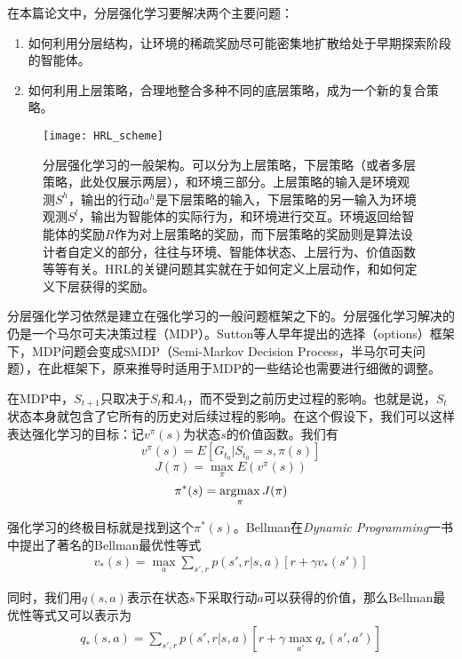 在本篇论文中，分层强化学习要解决两个主要问题：
\begin{enumerate}
  \item 如何利用分层结构，让环境的稀疏奖励尽可能密集地扩散给处于早期探索阶段的智能体。
  \item 如何利用上层策略，合理地整合多种不同的底层策略，成为一个新的复合策略。
\end{enumerate}

\begin{figure}[h] %
  \centering
  \texttt{[image: HRL\_scheme]}
  \caption{分层强化学习的一般架构。可以分为上层策略，下层策略（或者多层策略，此处仅展示两层），和环境三部分。上层策略的输入是环境观测$S^h$，输出的行动$a^h$是下层策略的输入，下层策略的另一输入为环境观测$S^l$，输出为智能体的实际行为，和环境进行交互。环境返回给智能体的奖励$R$作为对上层策略的奖励，而下层策略的奖励则是算法设计者自定义的部分，往往与环境、智能体状态、上层行为、价值函数等等有关。HRL的关键问题其实就在于如何定义上层动作，和如何定义下层获得的奖励。}
  \label{fig:HRL_scheme}
\end{figure}

分层强化学习依然是建立在强化学习的一般问题框架之下的。分层强化学习解决的仍是一个马尔可夫决策过程（MDP）\cite{Bellman_MDP}。Sutton等人早年提出的选择（options\cite{Sutton:1998_options}）框架下，MDP问题会变成SMDP（Semi-Markov Decision Process，半马尔可夫问题），在此框架下，原来推导时适用于MDP的一些结论也需要进行细微的调整。

在MDP中，$S_{t+1}$只取决于$S_t$和$A_t$，而不受到之前历史过程的影响。也就是说，$S_t$状态本身就包含了它所有的历史对后续过程的影响。在这个假设下，我们可以这样表达强化学习的目标\cite{DRL_for_driving}：记$v^{\pi}(s)$为状态$s$的价值函数。我们有$$ v^{\pi}(s) = E[G_{t_0} | S_{t_0} = s, \pi(s) ] $$
      $$ J(\pi) = \max_{\pi} E(v^{\pi}(s)) $$
      $$ \pi^*(s) = \operatorname*{argmax}_{\pi} J(\pi) $$
    \par 强化学习的终极目标就是找到这个$\pi^*(s)$。Bellman在\textit{Dynamic Programming}一书中提出了著名的Bellman最优性等式\cite{Bellman_DP}
    \begin{align}
       v_*(s) = \max_{a} \sum_{s', r}p(s', r | s, a)[r + \gamma v_*(s')]
    \end{align}
    \par 同时，我们用$q(s, a)$表示在状态$s$下采取行动$a$可以获得的价值，那么Bellman最优性等式又可以表示为
    \begin{align}
       q_*(s, a) = \sum_{s', r}p(s', r | s, a)[r + \gamma \max_{a'} q_*(s', a')]
    \end{align}


